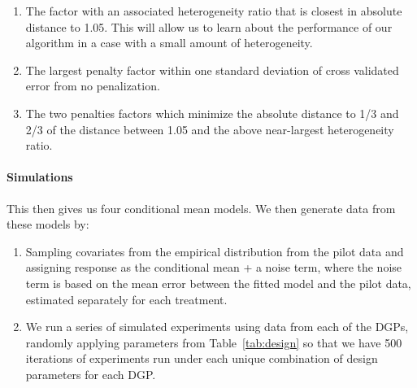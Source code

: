 \documentclass[letterpaper, 12pt, parskip=full,]{scrartcl}
\begin{document}
\begin{enumerate}
\begin{enumerate}
\item The factor with an associated heterogeneity ratio that is closest in absolute distance to 1.05. This will allow us to learn about the performance of our algorithm in a case with a small amount of heterogeneity. 
\item The largest penalty factor within one standard deviation of cross validated error from no penalization. 
\item The two penalties factors which minimize the absolute distance to 1/3 and 2/3 of the distance between 1.05 and the above near-largest heterogeneity ratio. 
\end{enumerate}
\end{enumerate}

\paragraph{Simulations}
This then gives us four conditional mean models. We then generate data from these models by:
\begin{enumerate}
\item  Sampling covariates from the empirical distribution from the pilot data and assigning response as the conditional mean + a noise term, where the noise term is based on the mean error between the fitted model and the pilot data, estimated separately for each treatment. 
\item We run a series of simulated experiments using data from each of the DGPs, randomly applying parameters from Table~\ref{tab:design} so that we have 500 iterations of experiments run under each unique combination of design parameters for each DGP. 
\end{enumerate}
\end{document}
